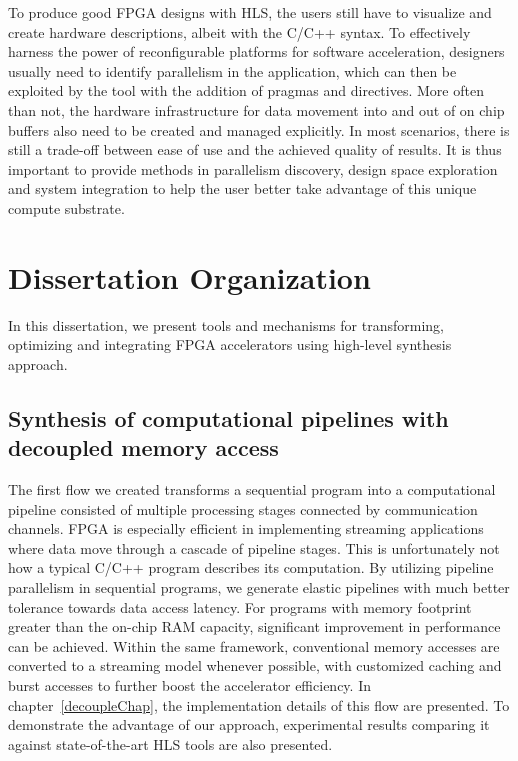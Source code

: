 To produce good FPGA designs with HLS, 
the users still have to visualize and create hardware descriptions,
albeit with the C/C++ syntax.
To effectively harness the power of reconfigurable platforms for software acceleration, designers usually need to identify parallelism
in the application, which can then be exploited by the tool with the addition of pragmas and directives. 
More often than not, the hardware infrastructure for data movement into and out of on chip buffers also need to be created and managed explicitly.
In most scenarios, there is still a trade-off between ease of use and the achieved quality of results. 
It is thus important to provide methods in parallelism discovery, design space exploration and system integration
to help the user better take advantage of this unique compute substrate.
\section{Dissertation Organization}

In this dissertation, we present tools and mechanisms for transforming, optimizing and integrating FPGA accelerators using high-level synthesis approach.

\subsection{Synthesis of computational pipelines with decoupled memory access}

The first flow we created transforms a sequential program into a computational pipeline consisted of multiple
processing stages connected by communication channels. FPGA is especially efficient in implementing streaming 
applications where data move through a cascade of pipeline stages. This is unfortunately not how a typical 
C/C++ program describes its computation. By utilizing pipeline parallelism in sequential programs, 
we generate elastic pipelines with much better tolerance towards data access latency.
For programs with memory footprint greater than the on-chip RAM capacity, significant improvement in performance
can be achieved. Within the same framework, conventional memory accesses are converted to a streaming model whenever
possible, with customized caching and burst accesses to further boost the accelerator efficiency. 
In chapter~\ref{decoupleChap}, the implementation details of this flow are presented. To demonstrate 
the advantage of our approach, experimental results comparing it against state-of-the-art HLS tools
are also presented.

